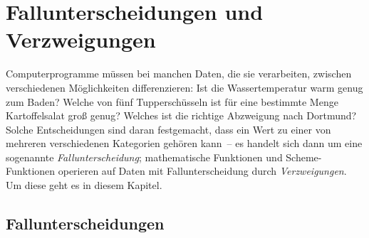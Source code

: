 

\chapter{Fallunterscheidungen und Verzweigungen}
\label{cha:conditionals}

Computerprogramme müssen bei manchen Daten, die sie
verarbeiten, zwischen verschiedenen Möglichkeiten differenzieren: Ist
die Wassertemperatur warm genug zum Baden?  Welche von fünf
Tupperschüsseln ist für eine bestimmte Menge Kartoffelsalat groß
genug?  Welches ist die richtige Abzweigung nach Dortmund?  Solche
Entscheidungen sind daran festgemacht, dass ein Wert zu einer von mehreren
verschiedenen 
Kategorien gehören kann~-- es handelt sich dann um eine sogenannte
\textit{Fallunterscheidung}; 
mathematische Funktionen und Scheme-Funktionen operieren auf Daten mit
Fallunterscheidung durch \textit{Verzweigungen}.
Um diese geht es in diesem Kapitel.

\section{Fallunterscheidungen}
\label{sec:fallunterscheidungen}

